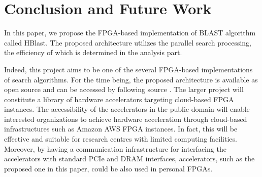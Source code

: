 \section{Conclusion and Future Work}
\label{sec:concl}

In this paper, we propose the FPGA-based implementation of BLAST algorithm called HBlast. The proposed architecture utilizes the parallel search processing, the efficiency of which is determined in the analysis part. 


Indeed, this project aims to be one of the several FPGA-based implementations of search algorithms. For the time being, the proposed architecture is available as open source and can be accessed by following source \cite{HBlast2019}. The larger project will constitute a library of hardware accelerators targeting cloud-based FPGA instances. The accessibility of the accelerators in the public domain will enable interested organizations to achieve hardware acceleration through cloud-based infrastructures such as Amazon AWS FPGA instances. In fact, this will be effective and suitable for research centres with limited computing facilities. Moreover, by having a communication infrastructure for interfacing the accelerators with standard PCIe and DRAM interfaces, accelerators, such as the proposed one in this paper, could be also used in personal FPGAs.  


